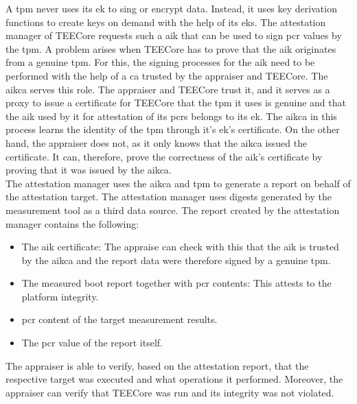 A \gls{tpm} never uses its \gls{ek} to sing or encrypt data. Instead, it uses
key derivation functions to create keys on demand with the help of its
\glspl{ek}. The attestation manager of TEECore requests such a \gls{aik} that
can be used to sign \gls{pcr} values by the \gls{tpm}. A problem arises when
TEECore has to prove that the \gls{aik} originates from a genuine \gls{tpm}. For
this, the signing processes for the \gls{aik} need to be performed with the help
of a \gls{ca} trusted by the appraiser and TEECore. The \gls{aikca} serves this
role. The appraiser and TEECore trust it, and it serves as a proxy to issue a
certificate for TEECore that the \gls{tpm} it uses is genuine and that the
\gls{aik} used by it for attestation of its \glspl{pcr} belongs to its \gls{ek}.
The \gls{aikca} in this process learns the identity of the \gls{tpm} through
it's \gls{ek}'s certificate. On the other hand, the appraiser does not, as it
only knows that the \gls{aikca} issued the certificate. It can, therefore, prove
the correctness of the \gls{aik}'s certificate by proving that it was issued by
the \gls{aikca}.\\

The attestation manager uses the \gls{aikca} and \gls{tpm} to generate a report
on behalf of the attestation target. The attestation manager uses digests
generated by the measurement tool as a third data source. The report created by
the attestation manager contains the following:
\begin{itemize}
    \item The \gls{aik} certificate: The appraise can check with this that the
          \gls{aik} is trusted by the \gls{aikca} and the report data were
          therefore signed by a genuine \gls{tpm}.
    \item The measured boot report together with \gls{pcr} contents: This attests
          to the platform integrity.
    \item \gls{pcr} content of the target measurement results.
    \item The \gls{pcr} value of the report itself.
\end{itemize}

The appraiser is able to verify, based on the attestation report, that the
respective target was executed and what operations it performed. Moreover, the
appraiser can verify that TEECore was run and its integrity was not
violated.

